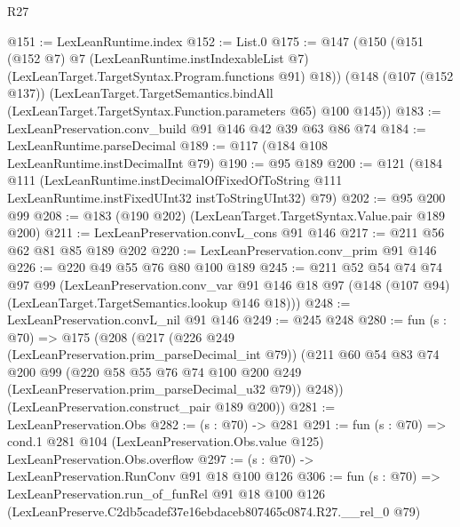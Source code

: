 \begin{lexlean}{R27}
\begin{coremodule}
@151 := LexLeanRuntime.index
@152 := List.{0}
@175 := @147
    (@150
      (@151
        (@152 @7)
        @7
        (LexLeanRuntime.instIndexableList @7)
        (LexLeanTarget.TargetSyntax.Program.functions @91)
        @18))
    (@148
      (@107 (@152 @137))
      (LexLeanTarget.TargetSemantics.bindAll
        (LexLeanTarget.TargetSyntax.Function.parameters @65)
        @100
        @145))
@183 := LexLeanPreservation.conv_build @91 @146 @42 @39 @63 @86 @74
@184 := LexLeanRuntime.parseDecimal
@189 := @117 (@184 @108 LexLeanRuntime.instDecimalInt @79)
@190 := @95 @189
@200 := @121
    (@184
      @111
      (LexLeanRuntime.instDecimalOfFixedOfToString
        @111
        LexLeanRuntime.instFixedUInt32
        instToStringUInt32)
      @79)
@202 := @95 @200 @99
@208 := @183 (@190 @202) (LexLeanTarget.TargetSyntax.Value.pair @189 @200)
@211 := LexLeanPreservation.convL_cons @91 @146
@217 := @211 @56 @62 @81 @85 @189 @202
@220 := LexLeanPreservation.conv_prim @91 @146
@226 := @220 @49 @55 @76 @80 @100 @189
@245 := @211
    @52
    @54
    @74
    @74
    @97
    @99
    (LexLeanPreservation.conv_var
      @91
      @146
      @18
      @97
      (@148 (@107 @94) (LexLeanTarget.TargetSemantics.lookup @146 @18)))
@248 := LexLeanPreservation.convL_nil @91 @146
@249 := @245 @248
@280 := fun (s : @70) =>
  @175
    (@208
      (@217
        (@226 @249 (LexLeanPreservation.prim_parseDecimal_int @79))
        (@211
          @60
          @54
          @83
          @74
          @200
          @99
          (@220 @58 @55 @76 @74 @100 @200 @249 (LexLeanPreservation.prim_parseDecimal_u32 @79))
          @248))
      (LexLeanPreservation.construct_pair @189 @200))
@281 := LexLeanPreservation.Obs
@282 := (s : @70) -> @281
@291 := fun (s : @70) =>
  cond.{1} @281 @104 (LexLeanPreservation.Obs.value @125) LexLeanPreservation.Obs.overflow
@297 := (s : @70) -> LexLeanPreservation.RunConv @91 @18 @100 @126
@306 := fun (s : @70) =>
  LexLeanPreservation.run_of_funRel
    @91
    @18
    @100
    @126
    (LexLeanPreserve.C2db5cadef37e16ebdaceb807465c0874.R27.__rel_0 @79)
\end{coremodule}
\end{lexlean}
